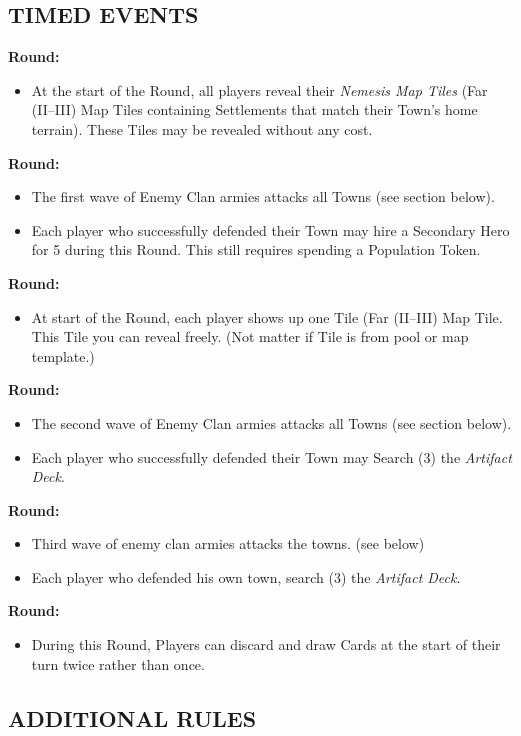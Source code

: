 \begin{multicols}{2}
\subsection*{\MakeUppercase{Timed Events}}
\textbf{ Round:}
\begin{itemize}
  \item At the start of the Round, all players reveal their \textit{Nemesis Map Tiles} (Far (II--III) Map Tiles containing Settlements that match their Town's home terrain). These Tiles may be revealed without any cost.
\end{itemize}
\textbf{ Round:}
\begin{itemize}
  \item The first wave of Enemy Clan armies attacks all Towns (see section below).
  \item Each player who successfully defended their Town may hire a Secondary Hero for 5  during this Round. This still requires spending a Population Token.
    \end{itemize}
    \textbf{ Round:}
    \begin{itemize}
      \item At start of the Round, each player shows up one Tile (Far (II--III) Map Tile. This Tile you can reveal freely. (Not matter if Tile is from pool or map template.)
\end{itemize}
\textbf{ Round:}
\begin{itemize}
  \item The second wave of Enemy Clan armies attacks all Towns (see section below).
  \item Each player who successfully defended their Town may Search (3) the \textit{Artifact Deck}.
     \end{itemize}
    \textbf{ Round:}
    \begin{itemize}
      \item Third wave of enemy clan armies attacks the towns. (see below)
      \item Each player who defended his own town, search (3) the \textit{Artifact Deck}.
    \end{itemize}
    \textbf{ Round:}
    \begin{itemize}
      \item During this Round, Players can discard and draw Cards at the start of their turn twice rather than once.
    \end{itemize}

\subsection*{\MakeUppercase{Additional Rules}}


\end{multicols}
